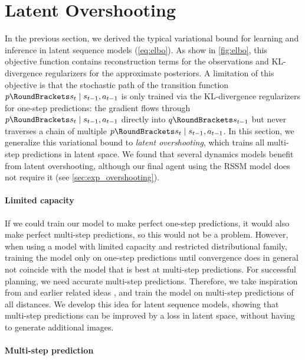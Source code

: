 \section{Latent Overshooting}
\label{sec:overshooting}



In the previous section, we derived the typical variational bound for learning and inference in latent sequence models (\cref{eq:elbo}). As show in \cref{fig:elbo}, this objective function contains reconstruction terms for the observations and KL-divergence regularizers for the approximate posteriors. A limitation of this objective is that the stochastic path of the transition function $\p(s_t|s_{t-1},a_{t-1})$ is only trained via the KL-divergence regularizers for one-step predictions: the gradient flows through $\p(s_t|s_{t-1},a_{t-1})$ directly into $\q(s_{t-1})$ but never traverses a chain of multiple $\p(s_t|s_{t-1},a_{t-1})$. In this section, we generalize this variational bound to \emph{latent overshooting}, which trains all multi-step predictions in latent space. We found that several dynamics models benefit from latent overshooting, although our final agent using the RSSM model does not require it (see \cref{sec:exp_overshooting}).

\paragraph{Limited capacity}

If we could train our model to make perfect one-step predictions, it would also make perfect multi-step predictions, so this would not be a problem. However, when using a model with limited capacity and restricted distributional family, training the model only on one-step predictions until convergence does in general not coincide with the model that is best at multi-step predictions. For successful planning, we need accurate multi-step predictions. Therefore, we take inspiration from \citet{amos2018awareness} and earlier related ideas \citep{krishnan2015deepkalman,lamb2016professor,chiappa2017recurrent}, and train the model on multi-step predictions of all distances. We develop this idea for latent sequence models, showing that multi-step predictions can be improved by a loss in latent space, without having to generate additional images.

\paragraph{Multi-step prediction}


